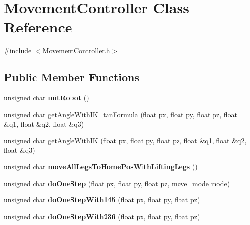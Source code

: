 \hypertarget{class_movement_controller}{}\section{Movement\+Controller Class Reference}
\label{class_movement_controller}


{\ttfamily \#include $<$Movement\+Controller.\+h$>$}

\subsection*{Public Member Functions}
\begin{DoxyCompactItemize}
\item 
\mbox{\label{class_movement_controller_aed25a9c08f44c223108137bc932ddd35}} 
unsigned char {\bfseries init\+Robot} ()
\item 
unsigned char \mbox{\hyperlink{class_movement_controller_a5765726eb4e820a7ac669c88fe4937e7}{get\+Angle\+With\+I\+K\+\_\+tan\+Formula}} (float px, float py, float pz, float \&q1, float \&q2, float \&q3)
\item 
unsigned char \mbox{\hyperlink{class_movement_controller_a53d19d2516a2ed440c2b15fc47ea91b7}{get\+Angle\+With\+IK}} (float px, float py, float pz, float \&q1, float \&q2, float \&q3)
\item 
\mbox{\label{class_movement_controller_aa0894291e1ea8f3a34d3382433cced48}} 
unsigned char {\bfseries move\+All\+Legs\+To\+Home\+Pos\+With\+Lifting\+Legs} ()
\item 
\mbox{\label{class_movement_controller_a57b517904e0e2f1202f8fdf26af06255}} 
unsigned char {\bfseries do\+One\+Step} (float px, float py, float pz, move\+\_\+mode mode)
\item 
\mbox{\label{class_movement_controller_a93ef2bf5b33c95bade19268a176c0a01}} 
unsigned char {\bfseries do\+One\+Step\+With145} (float px, float py, float pz)
\item 
\mbox{\label{class_movement_controller_a8eab727fdaed92f9f0d730d3420bec8e}} 
unsigned char {\bfseries do\+One\+Step\+With236} (float px, float py, float pz)
\item 

\end{DoxyCompactItemize}
